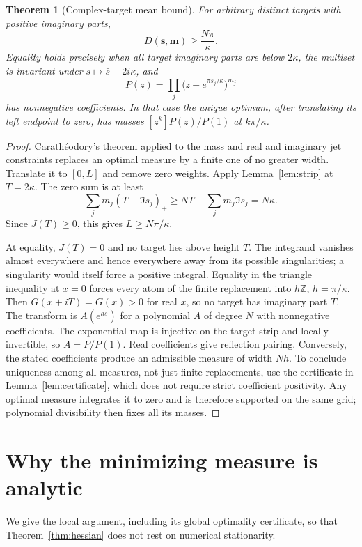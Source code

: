 \documentclass[11pt]{article}
\newtheorem{theorem}{Theorem}[section]
\theoremstyle{remark}\newtheorem{remark}[theorem]{Remark}
\begin{document}
\begin{theorem}[Complex-target mean bound]\label{thm:mean}
For arbitrary distinct targets with positive imaginary parts,
\[
 D(\boldsymbol s,\boldsymbol m)\ge\frac{N\pi}{\kappa}.
\]
Equality holds precisely when all target imaginary parts are below $2\kappa$, the multiset is invariant under $s\mapsto\bar s+2i\kappa$, and
\[
 P(z)=\prod_j\bigl(z-e^{\pi s_j/\kappa}\bigr)^{m_j}
\]
has nonnegative coefficients. In that case the unique optimum, after translating its left endpoint to zero, has masses $[z^k]P(z)/P(1)$ at $k\pi/\kappa$.
\end{theorem}
\begin{proof}
Carath\'eodory's theorem applied to the mass and real and imaginary jet constraints replaces an optimal measure by a finite one of no greater width. Translate it to $[0,L]$ and remove zero weights. Apply Lemma~\ref{lem:strip} at $T=2\kappa$. The zero sum is at least
\[
 \sum_jm_j(T-\Im s_j)_+\ge NT-\sum_jm_j\Im s_j=N\kappa.
\]
Since $J(T)\ge0$, this gives $L\ge N\pi/\kappa$.

At equality, $J(T)=0$ and no target lies above height $T$. The integrand vanishes almost everywhere and hence everywhere away from its possible singularities; a singularity would itself force a positive integral. Equality in the triangle inequality at $x=0$ forces every atom of the finite replacement into $h\mathbb Z$, $h=\pi/\kappa$. Then $G(x+iT)=G(x)>0$ for real $x$, so no target has imaginary part $T$. The transform is $A(e^{hs})$ for a polynomial $A$ of degree $N$ with nonnegative coefficients. The exponential map is injective on the target strip and locally invertible, so $A=P/P(1)$. Real coefficients give reflection pairing. Conversely, the stated coefficients produce an admissible measure of width $Nh$. To conclude uniqueness among all measures, not just finite replacements, use the certificate in Lemma~\ref{lem:certificate}, which does not require strict coefficient positivity. Any optimal measure integrates it to zero and is therefore supported on the same grid; polynomial divisibility then fixes all its masses.
\end{proof}

\section{Why the minimizing measure is analytic}

We give the local argument, including its global optimality certificate, so that Theorem~\ref{thm:hessian} does not rest on numerical stationarity.
\end{document}
